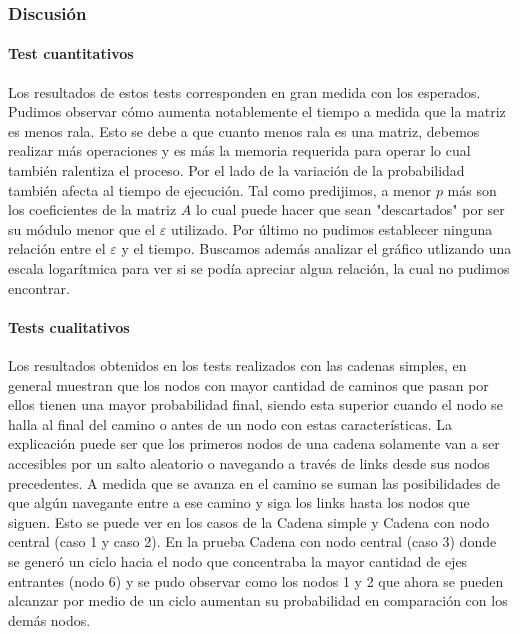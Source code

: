 \subsubsection*{Discusión}
\paragraph{Test cuantitativos}
Los resultados de estos tests corresponden en gran medida con los esperados. Pudimos observar c\'omo aumenta notablemente el tiempo
a medida que la matriz es menos rala. Esto se debe a que cuanto menos rala es una matriz, debemos realizar m\'as operaciones y es m\'as la
memoria requerida para operar lo cual también ralentiza el proceso.\newline
Por el lado de la variaci\'on de la probabilidad también afecta al tiempo de ejecuci\'on. Tal como predijimos, a menor $p$ m\'as son
los coeficientes de la matriz $A$ lo cual puede hacer que sean "descartados" por ser su m\'odulo menor que el $\varepsilon$ utilizado.\newline
Por \'ultimo no pudimos establecer ninguna relaci\'on entre el $\varepsilon$ y el tiempo. Buscamos además
analizar el gr\'afico utlizando una escala logar\'itmica para ver si se pod\'ia apreciar algua relaci\'on, la cual no pudimos encontrar.
\paragraph{Tests cualitativos}
Los resultados obtenidos en los tests realizados con las cadenas simples, en general muestran que los nodos con mayor cantidad de caminos que pasan por ellos tienen una mayor probabilidad final, siendo esta superior cuando el nodo se halla al final del camino o antes de un nodo con estas características. La explicación puede ser que los primeros nodos de una cadena solamente van a ser accesibles por un salto aleatorio o navegando a través de links desde sus nodos precedentes. A medida que se avanza en el camino se suman las posibilidades de que algún navegante entre a ese camino y siga los links hasta los nodos que siguen. Esto se puede ver en los casos de la Cadena simple y Cadena con nodo central (caso 1 y caso 2). En la prueba Cadena con nodo central (caso 3) donde se generó un ciclo hacia el nodo que concentraba la mayor cantidad de ejes entrantes (nodo 6) y se pudo observar como los nodos 1 y 2 que ahora se pueden alcanzar por medio de un ciclo aumentan su probabilidad en comparación con los demás nodos.

